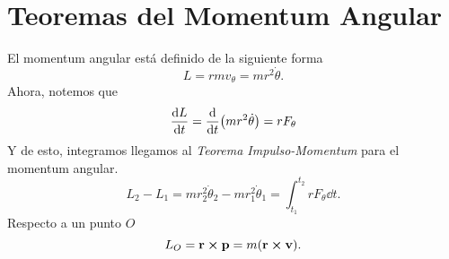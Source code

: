 \section{Teoremas del Momentum Angular}
El momentum angular está definido de la siguiente forma
\begin{equation}
L = rmv_\theta = mr^2 \dot{\theta}.
\end{equation}
Ahora, notemos que 
\begin{equation}
	\dv{L}{t} = \dv{t} (mr^2 \dot{\theta}) = rF_\theta
\end{equation}
Y de esto, integramos llegamos al \textit{Teorema Impulso-Momentum} para el momentum angular.
\begin{equation}
	L_2 - L_1 = mr_2 ^2 \dot{\theta} _2 - mr_1 ^2 \dot{\theta} _1 = \int _{t_1} ^{t_2} rF_\theta \dd{t}.
\end{equation}
Respecto a un punto $O$
\begin{equation}
	L_O = \vb{r} \cp \vb{p} = m\qty(\vb{r} \cp \vb{v}).
\end{equation}



